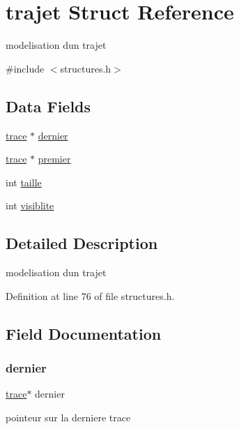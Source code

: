 \hypertarget{structtrajet}{}\section{trajet Struct Reference}
\label{structtrajet}


modelisation d\textquotesingle{}un trajet  




{\ttfamily \#include $<$structures.\+h$>$}

\subsection*{Data Fields}
\begin{DoxyCompactItemize}
\item 
\hyperlink{structtrace}{trace} $\ast$ \hyperlink{structtrajet_a0f24911c2181642cd5909d397ac74b2c}{dernier}
\item 
\hyperlink{structtrace}{trace} $\ast$ \hyperlink{structtrajet_acc04ed138412836472c25ba9913c7474}{premier}
\item 
int \hyperlink{structtrajet_a29bf3fc0ffe4e72e45f0c84ab4f8cd1e}{taille}
\item 
int \hyperlink{structtrajet_a46e7ab7119b26df81cade0dc996c4e18}{visiblite}
\end{DoxyCompactItemize}


\subsection{Detailed Description}
modelisation d\textquotesingle{}un trajet 

Definition at line 76 of file structures.\+h.



\subsection{Field Documentation}
\hypertarget{structtrajet_a0f24911c2181642cd5909d397ac74b2c}{}\label{structtrajet_a0f24911c2181642cd5909d397ac74b2c} 
\subsubsection{\texorpdfstring{dernier}{dernier}}
{\footnotesize\ttfamily \hyperlink{structtrace}{trace}$\ast$ dernier}

pointeur sur la derniere trace 

